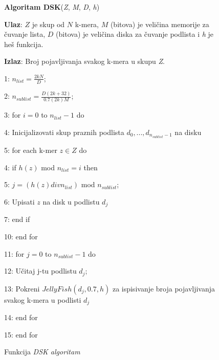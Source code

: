 \documentclass[12pt,oneside]{memoir}
\begin{document}
\begin{figure}[!ht]
\begin{tcolorbox}
\textbf{Algoritam DSK}(\textit{Z}, \textit{M}, \textit{D}, \textit{h})

\textbf{Ulaz}: $Z$ je skup od $N$ k-mera, $M$ (bitova) je veličina memorije za čuvanje lista, $D$ (bitova) je veličina diska za čuvanje podlista i \textit{h} je heš funkcija.

\textbf{Izlaz}: Broj pojavljivanja svakog k-mera u skupu \textit{Z}.

1: $n_{list} = \frac{2kN}{D}$;

2: $n_{sublist} = \frac{D(2k + 32)}{0.7(2k)M}$;

3: for $i = 0$ to $n_{list} - 1$ do

4:\hspace{1cm} Inicijalizovati skup praznih podlista ${d_0,..., d_{n_{sublist} - 1}}$ na disku

5:\hspace{1cm} for each k-mer $z \in Z$ do

4:\hspace{2cm} if $h(z)$ mod $n_{list} = i$ then

5:\hspace{3cm} $j = (h(z) div n_{list})$ mod $n_{sublist}$;

6:\hspace{3cm} Upisati $z$ na disk u podlistu $d_j$

7:\hspace{2cm} end if

10:\hspace{1cm} end for

11:\hspace{1cm} for $j = 0$ to $n_{sublist} - 1$ do

12:\hspace{2cm} Učitaj j-tu podlistu $d_j$;

13:\hspace{2cm} Pokreni $JellyFish(d_j, 0.7, h)$ za ispisivanje broja pojavljivanja svakog k-mera u podlisti $d_j$

14:\hspace{1cm} end for

15: end for
\end{tcolorbox}
\caption{Funkcija \textit{DSK algoritam} \cite{WingKinSung}}
\label{box:DSK}
\end{figure}
\end{document}
